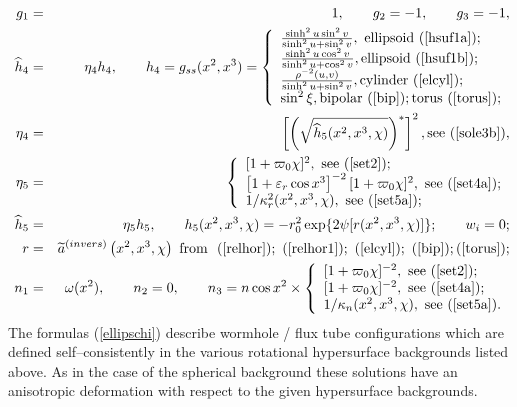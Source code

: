 \documentclass[a4paper,preprint,prabib,aps]{revtex4}
\begin{document}
\begin{eqnarray}
g_{1} &=&1,\qquad g_{2}=-1,\qquad g_{3}=-1,   \label{ellipschi} \\
\widehat{h}_{4} &=&\eta _{4}h_{4},\qquad h_{4}=g_{ss}(x^{2},x^{3})=\left\{
\begin{array}{l}
\frac{\sinh ^{2}u\sin ^{2}v}{\sinh ^{2}u+\sin ^{2}v},%
\mbox{ ellipsoid
(\ref{hsuf1a})}; \\
\frac{\sinh ^{2}u\cos ^{2}v}{\sinh ^{2}u+\cos ^{2}v},%
\mbox{ellipsoid
(\ref{hsuf1b})}; \\
\frac{\rho ^{-2}(u,v)}{\sinh ^{2}u+\sin ^{2}v},\mbox{cylinder (\ref{elcyl})};
\\
\sin ^{2}\xi ,\mbox{bipolar  (\ref{bip})};\mbox{torus  (\ref{torus})};
\end{array}
\right.   \nonumber \\
\eta _{4} &=&\left[ \left( \sqrt{\widehat{h}_{5}(x^{2},x^{3},\chi )}\right)
^{\ast }\right] ^{2},\mbox{see (\ref{sole3b})}, \\
\eta _{5} &=&\left\{
\begin{array}{l}
\lbrack 1+\varpi _{0}\chi ]^{2},\mbox{ see  (\ref{set2})}; \\
\left[ 1+\varepsilon _{r}\cos x^{3}\right] ^{-2}[1+\varpi _{0}\chi ]^{2},%
\mbox{
see  (\ref{set4a})}; \\
1/\kappa _{r}^{2}(x^{2},x^{3},\chi ),\mbox{ see  (\ref{set5a})};
\end{array}
\right.   \nonumber \\
\widehat{h}_{5} &=&\eta _{5}h_{5},\qquad h_{5}(x^{2},x^{3},\chi
)=-r_{0}^{2}\exp \{2\psi \lbrack r(x^{2},x^{3},\chi )]\};\qquad w_{i}=0;
\nonumber \\
r &=&\widetilde{a}^{(invers)}\left( x^{2},x^{3},\chi \right) \mbox{ from }%
\mbox{
(\ref{relhor})};\mbox{ (\ref{relhor1})};\mbox{ (\ref{elcyl})};%
\mbox{
(\ref{bip})};\mbox{(\ref{torus})};  \nonumber \\
\ n_{1} &=&\omega (x^{2}),\qquad n_{2}=0,\qquad n_{3}=n\cos x^{2}\times
\left\{
\begin{array}{l}
\lbrack 1+\varpi _{0}\chi ]^{-2},\mbox{ see  (\ref{set2})}; \\
\lbrack 1+\varpi _{0}\chi ]^{-2},\mbox{ see  (\ref{set4a})}; \\
1/\kappa _{n}(x^{2},x^{3},\chi ),\mbox{ see  (\ref{set5a})}.
\end{array}
\right.   \nonumber
\end{eqnarray}
The formulas (\ref{ellipschi}) describe wormhole / flux tube configurations
which are defined self--consistently in the various rotational hypersurface
backgrounds listed above. As in the case of the spherical background these
solutions have an anisotropic deformation with respect to the given
hypersurface backgrounds.
\end{document}
